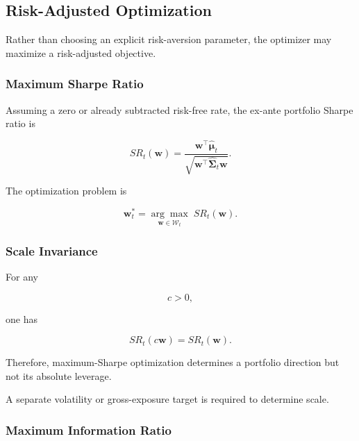 \documentclass[11pt,a4paper]{article}
\begin{document}
\subsection{Risk-Adjusted Optimization}
\label{subsec:risk_adjusted_optimization}

Rather than choosing an explicit risk-aversion parameter, the optimizer may
maximize a risk-adjusted objective.


\subsubsection{Maximum Sharpe Ratio}

Assuming a zero or already subtracted risk-free rate, the ex-ante portfolio
Sharpe ratio is

\begin{equation}
\boxed{
SR_t(\mathbf{w})
=
\frac{
\mathbf{w}^{\top}
\widehat{\boldsymbol{\mu}}_t
}{
\sqrt{
\mathbf{w}^{\top}
\widehat{\boldsymbol{\Sigma}}_t
\mathbf{w}
}
}.
}
\end{equation}

The optimization problem is

\begin{equation}
\boxed{
\mathbf{w}_t^{*}
=
\underset{\mathbf{w}\in\mathcal{W}_t}{\arg\max}
\;
SR_t(\mathbf{w}).
}
\end{equation}


\subsubsection{Scale Invariance}

For any

\begin{equation}
c>0,
\end{equation}

one has

\begin{equation}
SR_t(c\mathbf{w})
=
SR_t(\mathbf{w}).
\end{equation}

Therefore, maximum-Sharpe optimization determines a portfolio direction but not
its absolute leverage.

A separate volatility or gross-exposure target is required to determine scale.


\subsubsection{Maximum Information Ratio}
\end{document}
